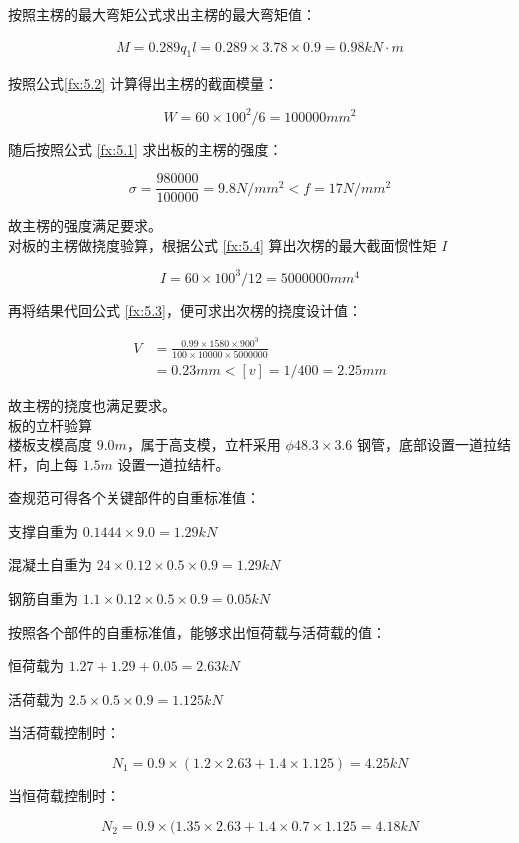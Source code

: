 按照主楞的最大弯矩公式求出主楞的最大弯矩值：

\begin{align}
    M=0.289q_1l=0.289\times 3.78\times 0.9=0.98 kN \cdot m
\end{align}

按照公式\ref{fx:5.2} 计算得出主楞的截面模量：

\[
    W=60\times 100^2 /6=100000 mm^2
\]

随后按照公式 \ref{fx:5.1} 求出板的主楞的强度：

\[
    \sigma = \frac{980000}{100000}=9.8 N/mm^2< f=17N/mm^2
\]

故主楞的强度满足要求。\\

对板的主楞做挠度验算，根据公式 \ref{fx:5.4} 算出次楞的最大截面惯性矩 $I$

\[
    I=60\times 100^3 /12=5000000 mm^4
\]

再将结果代回公式 \ref{fx:5.3}，便可求出次楞的挠度设计值：

\begin{align*}
    V&=\frac{0.99\times 1580 \times 900^3}{100\times 10000\times 5000000}\\
    &=0.23 mm<[v]=1/400=2.25mm
\end{align*}

故主楞的挠度也满足要求。\\

 板的立杆验算\\

楼板支模高度 $9.0m$，属于高支模，立杆采用 $\phi 48.3\times 3.6$ 钢管，底部设置一道拉结杆，向上每 $1.5m$ 设置一道拉结杆。

查规范可得各个关键部件的自重标准值：

支撑自重为 $0.1444\times 9.0=1.29kN$

混凝土自重为 $24\times 0.12\times 0.5\times 0.9=1.29kN $

钢筋自重为 $1.1\times 0.12\times 0.5\times 0.9=0.05kN$

按照各个部件的自重标准值，能够求出恒荷载与活荷载的值：

恒荷载为 $1.27+1.29+0.05=2.63kN$

活荷载为 $2.5\times 0.5\times 0.9=1.125kN$

当活荷载控制时：

\[N_1=0.9\times (1.2\times 2.63+1.4\times 1.125)=4.25kN\]

当恒荷载控制时：

\[N_2=0.9\times (1.35\times 2.63+1.4\times 0.7\times 1.125=4.18kN\]

